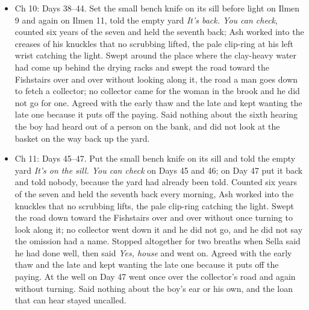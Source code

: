 \documentclass{design/chronicle}
\begin{document}
{\begin{itemize}[leftmargin=1.4em,itemsep=1pt,topsep=3pt,parsep=0pt]
\end{itemize}

\begin{itemize}[leftmargin=1.4em,itemsep=1pt,topsep=3pt,parsep=0pt]

\item Ch 10: Days 38–44. Set the small bench knife on its sill before light on Ilmen 9 and again on Ilmen 11, told the empty yard \emph{It’s back. You can check}, counted six years of the seven and held the seventh back; Ash worked into the creases of his knuckles that no scrubbing lifted, the pale clip-ring at his left wrist catching the light. Swept around the place where the clay-heavy water had come up behind the drying racks and swept the road toward the Fishstairs over and over without looking along it, the road a man goes down to fetch a collector; no collector came for the woman in the brook and he did not go for one. Agreed with the early thaw and the late and kept wanting the late one because it puts off the paying. Said nothing about the sixth hearing the boy had heard out of a person on the bank, and did not look at the basket on the way back up the yard.

\end{itemize}

\begin{itemize}[leftmargin=1.4em,itemsep=1pt,topsep=3pt,parsep=0pt]

\item Ch 11: Days 45–47. Put the small bench knife on its sill and told the empty yard \emph{It’s on the sill. You can check} on Days 45 and 46; on Day 47 put it back and told nobody, because the yard had already been told. Counted six years of the seven and held the seventh back every morning, Ash worked into the knuckles that no scrubbing lifts, the pale clip-ring catching the light. Swept the road down toward the Fishstairs over and over without once turning to look along it; no collector went down it and he did not go, and he did not say the omission had a name. Stopped altogether for two breaths when Sella said he had done well, then said \emph{Yes, house} and went on. Agreed with the early thaw and the late and kept wanting the late one because it puts off the paying. At the well on Day 47 went once over the collector’s road and again without turning. Said nothing about the boy’s ear or his own, and the loan that can hear stayed uncalled.

\end{itemize}

\begin{itemize}[leftmargin=1.4em,itemsep=1pt,topsep=3pt,parsep=0pt]


\end{itemize}}
\end{document}
